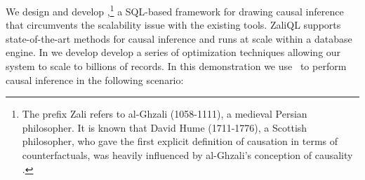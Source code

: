 
We design and develop \GSQL,\footnote{ The prefix Zali refers to
  al-Ghzali (1058-1111), a medieval Persian philosopher. It is known
  that David Hume (1711-1776), a Scottish philosopher, who gave the
  first explicit definition of causation in terms of counterfactuals,
  was heavily influenced by al-Ghzali's conception of causality
  \cite{shalizi2013advanced}.}  a SQL-based framework for drawing
causal inference that circumvents the scalability issue with the
existing tools.  ZaliQL supports state-of-the-art methods for causal
inference and runs at scale within a database engine.  In \GSQL we develop
develop a series of optimization techniques allowing our system to
scale to billions of records.   In this demonstration we use \GSQL \ to perform causal inference in the following scenario:






